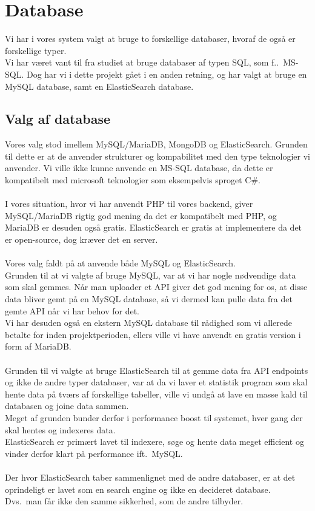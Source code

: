 \section{Database}
Vi har i vores system valgt at bruge to forskellige databaser, hvoraf de også er forskellige typer.
\\
Vi har været vant til fra studiet at bruge databaser af typen SQL, som f.\@eks.\ MS-SQL. Dog har vi i dette projekt
gået i en anden retning, og har valgt at bruge en MySQL database, samt en ElasticSearch database.
\subsection{Valg af database}
Vores valg stod imellem MySQL/MariaDB, MongoDB og ElasticSearch. Grunden til dette er at de anvender strukturer og
kompabilitet med den type teknologier vi anvender. Vi ville ikke kunne anvende en MS-SQL database, da dette er kompatibelt
med microsoft teknologier som eksempelvis sproget C\#.
\\\\
I vores situation, hvor vi har anvendt PHP til vores backend, giver MySQL/MariaDB rigtig god mening da det er kompatibelt med PHP,
og MariaDB er desuden også gratis. ElasticSearch er gratis at implementere da det er open-source, dog kræver det en server.
\\\\
Vores valg faldt på at anvende både MySQL og ElasticSearch.
\\
Grunden til at vi valgte af bruge MySQL, var at vi har nogle nødvendige data som skal gemmes. Når man uploader et API giver det god mening
for os, at disse data bliver gemt på en MySQL database, så vi dermed kan pulle data fra det gemte API når vi har behov for det.\\
Vi har desuden også en ekstern MySQL database til rådighed som vi allerede betalte for inden projektperioden, ellers ville vi have anvendt en gratis version i form af MariaDB.
\\\\
Grunden til vi valgte at bruge ElasticSearch til at gemme data fra API endpoints og ikke de andre typer databaser, var at da vi laver et statistik program
som skal hente data på tværs af forskellige tabeller, ville vi undgå at lave en masse kald til databasen og joine data sammen.
\\
Meget af grunden bunder derfor i performance boost til systemet, hver gang der skal hentes og indexeres data.
\\
ElasticSearch er primært lavet til indexere, søge og hente data meget efficient og vinder derfor klart på performance ift.\ MySQL\@. 
\\\\
Der hvor ElasticSearch taber sammenlignet med de andre databaser, er at det oprindeligt er lavet som en search engine og ikke en decideret database.
\\Dvs.\ man får ikke den samme sikkerhed, som de andre tilbyder.
